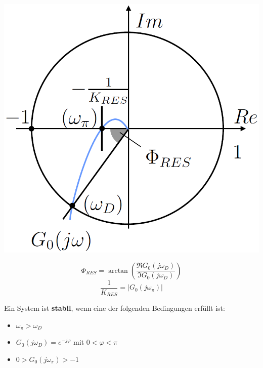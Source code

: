 \begin{minipage}[c]{0.48\columnwidth}
    \includegraphics[width=\columnwidth]{images/stabilitaetsreserven_1.png}
\end{minipage}
\hfill
\begin{minipage}[c]{0.5\columnwidth}

    $$ \boxed{\Phi_{RES} = \arctan \left( \frac{\Re{G_{0}(j \omega_{D})}}{\Im{G_{0}(j \omega_{D})}} \right) } $$
    $$ \boxed{\frac{1}{K_{RES}} = \big| G_{0}(j \omega_{\pi}) \big| } $$


     Ein System ist \textbf{stabil}, wenn eine der folgenden Bedingungen erfüllt ist:
     \vspace{0.2cm}

     \begin{itemize}
        \setlength\itemsep{4pt}
        \item $\omega_{\pi} > \omega_{D}$
        \item $G_{0}(j \omega_{D}) = e^{- j \varphi}$ \quad mit $0 < \varphi < \pi$
        \item $0 > G_{0}(j \omega_{\pi}) > -1 $
     \end{itemize}
\end{minipage}

\vspace{0.2cm}

